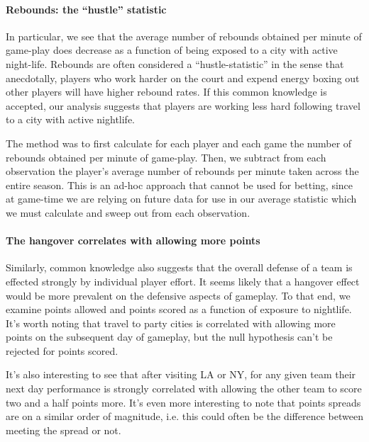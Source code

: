 \documentclass[letterpaper,12pt]{article}
\begin{document}
\paragraph{Rebounds: the ``hustle'' statistic}
In particular, we see that the average number of rebounds obtained per minute
of game-play does decrease as a function of being exposed to a city with active night-life. Rebounds are often considered a ``hustle-statistic'' in the sense 
that anecdotally, players who work harder on the court and expend energy boxing out
other players will have higher rebound rates. If this common knowledge is accepted,
our analysis suggests that players are working less hard following travel to a 
city with active nightlife.

The method was to first calculate for each player and each game the number of rebounds obtained
per minute of game-play. Then, we subtract from each observation the player's average number of rebounds per minute taken across the entire season.
This is an ad-hoc approach that cannot be used for betting, since at game-time we are relying on future data for use in our average statistic which we must calculate and sweep out from each observation.

\paragraph{The hangover correlates with allowing more points}
Similarly, common knowledge also suggests that the overall defense of a team
is effected strongly by individual player effort. It seems likely that a hangover effect
would be more prevalent on the defensive aspects of gameplay. To that end, we examine points allowed and points scored as a function of exposure to nightlife.
It's worth noting that travel to party cities is correlated with allowing
more points on the subsequent day of gameplay, but the null hypothesis
can't be rejected for points scored.

It's also interesting to see that after visiting LA or NY, for any given
team their next day performance is strongly correlated with allowing the other team to
score two and a half points more. 
It's even more interesting to note that points spreads are on a similar order of magnitude,  
i.e. this could often be the difference between meeting the spread or not.
\end{document}
